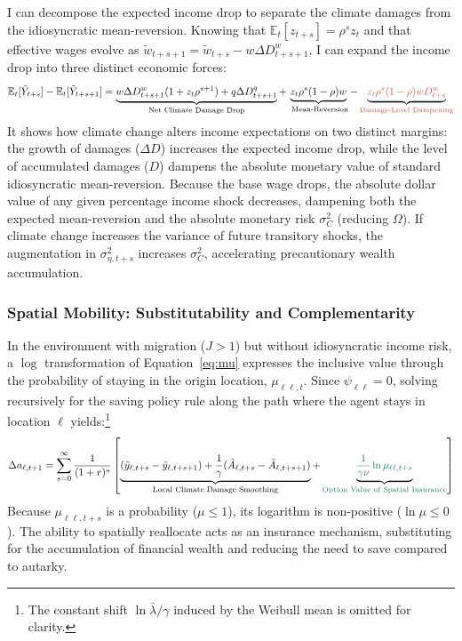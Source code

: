 \documentclass[11pt, a4paper]{article}
\begin{document}
I can decompose the expected income drop to separate the climate damages from the idiosyncratic mean-reversion. Knowing that $\mathbb{E}_t[z_{t+s}] = \rho^s z_t$ and that effective wages evolve as $\tilde{w}_{t+s+1} = \tilde{w}_{t+s} - w \Delta D^w_{t+s+1}$, I can expand the income drop into three distinct economic forces:
\begin{equation}
    \mathbb{E}_t[\tilde{Y}_{t+s}] - \mathbb{E}_t[\tilde{Y}_{t+s+1}] = \underbrace{w \Delta D^w_{t+s+1} (1 + z_t \rho^{s+1}) + q \Delta D^q_{t+s+1}}_{\text{Net Climate Damage Drop}} + \underbrace{z_t \rho^s (1 - \rho) w}_{\text{ Mean-Reversion}} - \underbrace{\textcolor{terracotta}{z_t \rho^s (1 - \rho) w D^w_{t+s}}}_{\textcolor{terracotta}{\text{Damage-Level Dampening}}}
    \label{eq:income_drop_decomp}
\end{equation}
It shows how climate change alters income expectations on two distinct margins: the growth of damages ($\Delta D$) increases the expected income drop, while the level of accumulated damages ($D$) dampens the absolute monetary value of standard idiosyncratic mean-reversion. Because the base wage drops, the absolute dollar value of any given percentage income shock decreases, dampening both the expected mean-reversion and the absolute monetary risk $\sigma_C^2$ (reducing $\Omega$). If climate change increases the variance of future transitory shocks, the augmentation in $\sigma_{\eta, t+s}^2$ increases $\sigma_C^2$, accelerating precautionary wealth accumulation.
\subsubsection*{Spatial Mobility: Substitutability and Complementarity}
In the environment with migration ($J > 1$) but without idiosyncratic income risk, a $\log$ transformation of Equation~\ref{eq:mu} expresses the inclusive value through the probability of staying in the origin location, $\mu_{\ell \ell, t}$. Since $\psi_{\ell\ell} = 0$, solving recursively for the saving policy rule along the path where the agent stays in location $\ell$ yields:\footnote{The constant shift $\ln\bar{\lambda}/\gamma$ induced by the Weibull mean is omitted for clarity.}
\begin{equation}
    \Delta a_{\ell, t+1} = \sum_{s=0}^{\infty} \frac{1}{(1+r)^s} \left[ \underbrace{(\tilde{y}_{\ell, t+s} - \tilde{y}_{\ell, t+s+1}) + \frac{1}{\gamma} (\tilde{A}_{\ell, t+s} - \tilde{A}_{\ell, t+s+1})}_{\text{Local Climate Damage Smoothing}} + \underbrace{\textcolor{emerald}{\frac{1}{\gamma \nu} \ln \mu_{\ell  \ell, t+s}}}_{\textcolor{emerald}{\text{Option Value of Spatial Insurance}}} \right]
    \label{eq:saving_spatial}
\end{equation}
Because $\mu_{\ell \ell, t+s}$ is a probability ($\mu \le 1$), its logarithm is non-positive ($\ln \mu \le 0$). The ability to spatially reallocate acts as an insurance mechanism, substituting for the accumulation of financial wealth and reducing the need to save compared to autarky.
\end{document}

